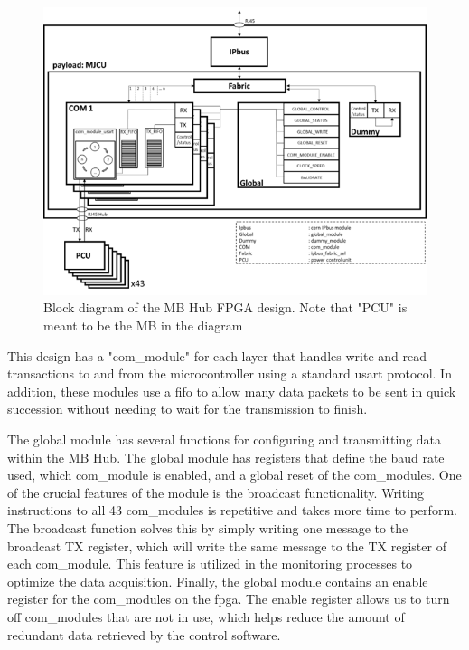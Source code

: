 \documentclass[main.tex]{subfiles}
\begin{document}
\begin{figure}[!htpb]
    \centering
    \includegraphics[width=13cm, scale=1]{images/BlockDiagramFPGA.png}
    \caption{Block diagram of the MB Hub FPGA design. Note that "PCU" is meant to be the MB in the diagram\cite{gutta}}
    \label{fig: fpga_block}
\end{figure}
\FloatBarrier

This design has a "com\_module" for each layer that handles write and read transactions to and from the microcontroller using a standard \gls{usart} protocol. In addition, these modules use a \gls{fifo} to allow many data packets to be sent in quick succession without needing to wait for the transmission to finish.

The global module has several functions for configuring and transmitting data within the MB Hub. The global module has registers that define the baud rate used, which com\_module is enabled, and a global reset of the com\_modules. One of the crucial features of the module is the broadcast functionality. Writing instructions to all 43 com\_modules is repetitive and takes more time to perform. The broadcast function solves this by simply writing one message to the broadcast TX register, which will write the same message to the TX register of each com\_module. This feature is utilized in the monitoring processes to optimize the data acquisition. Finally, the global module contains an enable register for the com\_modules on the \gls{fpga}. The enable register allows us to turn off com\_modules that are not in use, which helps reduce the amount of redundant data retrieved by the control software.
\end{document}
